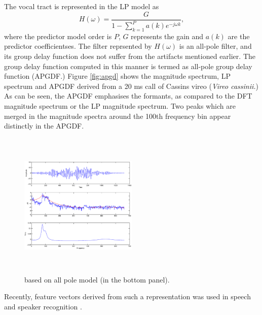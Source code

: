 \documentclass[a4paper]{article}
\begin{document}
The vocal tract is represented in the LP model as
\begin{equation}
H(\omega) = \frac{G}{1-\sum_{k=1}^{P} a(k) e^{-j \omega k}},
\end{equation}
where the predictor model order is $P$, $G$ represents the gain and $a(k)$ are
the predictor coefficientses\cite{makhoul}.
The filter reprsented by $H(\omega)$ is an all-pole filter, and its group delay
function does not suffer from the artifacts mentioned earlier. The group delay
function computed in this manner is termed as all-pole group delay
function (APGDF.) Figure \ref{fig:apgd} shows the magnitude spectrum, LP
spectrum and APGDF derived from a 20 ms call of Cassins vireo (\textit{Vireo
cassinii.}) As can be seen, the APGDF emphasises the formants, as compared to the
DFT magnitude spectrum or the LP magnitude spectrum. Two peaks which are merged
in the magnitude spectra around the 100th frequency bin appear distinctly in the
APGDF.

\begin{figure}[h]
\centering
\includegraphics[width=0.5\textwidth,height=7cm]{apGd.eps}
\caption{based on all pole model (in the bottom panel).}
\label{fig:all-pole}
\end{figure}


Recently, feature vectors
derived from such a representation was used in speech \cite{drugman} and speaker
recognition \cite{padman}. 



\end{document}
